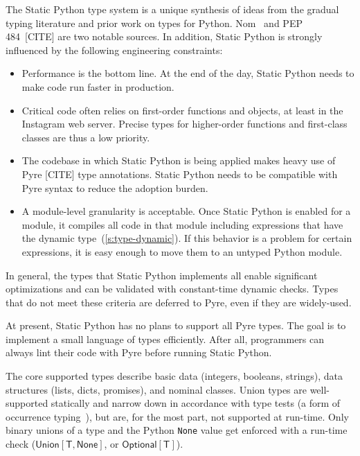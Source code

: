 \documentclass[english,cleveref,submission]{programming}
\newcommand{\SP}{Static Python}
\newcommand{\code}[1]{\texttt{#1}}
\newcommand{\typefont}[1]{\mathsf{#1}}
\newcommand{\paramtype}[2]{#1[#2]}
\newcommand{\sptype}{\typefont{T}}
\newcommand{\sptnone}{\typefont{None}}
\newcommand{\sptoptional}[1]{\paramtype{\typefont{Optional}}{#1}}
\newcommand{\sptunion}[1]{\paramtype{\typefont{Union}}{#1}}
\begin{document}
The \SP{} type system is a unique synthesis of ideas from the gradual typing literature
and prior work on types for Python.
Nom~\cite{mt-oopsla-2017,mt-oopsla-2021} and PEP 484~[CITE] are two notable sources.
In addition, \SP{} is strongly influenced by the following engineering constraints:
\begin{itemize}
  \item
    Performance is the bottom line.
    At the end of the day, \SP{} needs to make code run faster in production.
  \item
    Critical code often relies on first-order functions and objects,
    at least in the Instagram web server.
    Precise types for higher-order functions and first-class classes
    are thus a low priority.
  \item
    The codebase in which \SP{} is being applied makes heavy use of Pyre [CITE]
    type annotations.
    \SP{} needs to be compatible with Pyre syntax to reduce the adoption burden.
  \item
    A module-level granularity is acceptable.
    Once \SP{} is enabled for a module, it compiles all code in that module
    including expressions that have the dynamic type~(\cref{s:type-dynamic}).
    If this behavior is a problem for certain expressions, it is easy enough to move
    them to an untyped Python module.
\end{itemize}
%
In general, the types that \SP{} implements all enable significant optimizations
and can be validated with constant-time dynamic checks.
Types that do not meet these criteria are deferred to Pyre, even if they are widely-used.

At present, \SP{} has no plans to support all Pyre types.
The goal is to implement a small language of types efficiently.
After all, programmers can always lint their code with Pyre before running
\SP{}.

The core supported types describe basic data (integers, booleans, strings),
data structures (lists, dicts, promises),
and nominal classes.
Union types are well-supported statically and narrow down in accordance
with type tests (a form of occurrence typing~\cite{tf-icfp-2010,gsk-esop-2011}),
but are, for the most part, not supported at run-time.
Only binary unions of a type and the Python \code{None} value get enforced with a run-time check
($\sptunion{\sptype, \sptnone}$, or $\sptoptional{\sptype}$).
\end{document}
